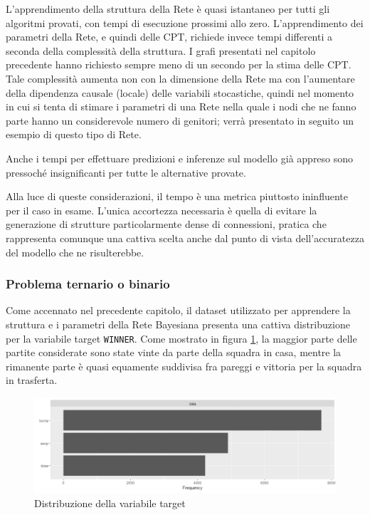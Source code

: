 \documentclass[hidelinks, 12pt]{article}
\begin{document}
L'apprendimento della struttura della Rete è quasi istantaneo per tutti gli algoritmi provati, con tempi di esecuzione prossimi allo zero. L'apprendimento dei parametri della Rete, e quindi delle CPT, richiede invece tempi differenti a seconda della complessità della struttura. I grafi presentati nel capitolo precedente hanno richiesto sempre meno di un secondo per la stima delle CPT. Tale complessità aumenta non con la dimensione della Rete ma con l'aumentare della dipendenza causale (locale) delle variabili stocastiche, quindi nel momento in cui si tenta di stimare i parametri di una Rete nella quale i nodi che ne fanno parte hanno un considerevole numero di genitori; verrà presentato in seguito un esempio di questo tipo di Rete.

Anche i tempi per effettuare predizioni e inferenze sul modello già appreso sono pressoché insignificanti per tutte le alternative provate.

Alla luce di queste considerazioni, il tempo è una metrica piuttosto ininfluente per il caso in esame. L'unica accortezza necessaria è quella di evitare la generazione di strutture particolarmente dense di connessioni, pratica che rappresenta comunque una cattiva scelta anche dal punto di vista dell'accuratezza del modello che ne risulterebbe.


\subsubsection{Problema ternario o binario}

Come accennato nel precedente capitolo, il dataset utilizzato per apprendere la struttura e i parametri della Rete Bayesiana presenta una cattiva distribuzione per la variabile target \texttt{WINNER}. Come mostrato in figura \ref{img:perf-target-distr}, la maggior parte delle partite considerate sono state vinte da parte della squadra in casa, mentre la rimanente parte è quasi equamente suddivisa fra pareggi e vittoria per la squadra in trasferta.

\begin{figure}[H]
	\centering
	\includegraphics[scale=0.6]{images/06_01_target-distr.png}
	\caption[Distribuzione della variabile target]{Distribuzione della variabile target}
	\label{img:perf-target-distr}
\end{figure}
\end{document}
